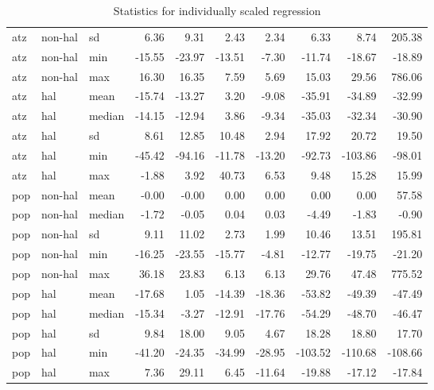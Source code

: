 \begin{table}[ht]
\begin{tabular}{lllrrrrrrr}
  atz & non-hal & sd & 6.36 & 9.31 & 2.43 & 2.34 & 6.33 & 8.74 & 205.38 \\ 
  atz & non-hal & min & -15.55 & -23.97 & -13.51 & -7.30 & -11.74 & -18.67 & -18.89 \\ 
  atz & non-hal & max & 16.30 & 16.35 & 7.59 & 5.69 & 15.03 & 29.56 & 786.06 \\ 
  atz & hal & mean & -15.74 & -13.27 & 3.20 & -9.08 & -35.91 & -34.89 & -32.99 \\ 
  atz & hal & median & -14.15 & -12.94 & 3.86 & -9.34 & -35.03 & -32.34 & -30.90 \\ 
  atz & hal & sd & 8.61 & 12.85 & 10.48 & 2.94 & 17.92 & 20.72 & 19.50 \\ 
  atz & hal & min & -45.42 & -94.16 & -11.78 & -13.20 & -92.73 & -103.86 & -98.01 \\ 
  atz & hal & max & -1.88 & 3.92 & 40.73 & 6.53 & 9.48 & 15.28 & 15.99 \\ 
  pop & non-hal & mean & -0.00 & -0.00 & 0.00 & 0.00 & 0.00 & 0.00 & 57.58 \\ 
  pop & non-hal & median & -1.72 & -0.05 & 0.04 & 0.03 & -4.49 & -1.83 & -0.90 \\ 
  pop & non-hal & sd & 9.11 & 11.02 & 2.73 & 1.99 & 10.46 & 13.51 & 195.81 \\ 
  pop & non-hal & min & -16.25 & -23.55 & -15.77 & -4.81 & -12.77 & -19.75 & -21.20 \\ 
  pop & non-hal & max & 36.18 & 23.83 & 6.13 & 6.13 & 29.76 & 47.48 & 775.52 \\ 
  pop & hal & mean & -17.68 & 1.05 & -14.39 & -18.36 & -53.82 & -49.39 & -47.49 \\ 
  pop & hal & median & -15.34 & -3.27 & -12.91 & -17.76 & -54.29 & -48.70 & -46.47 \\ 
  pop & hal & sd & 9.84 & 18.00 & 9.05 & 4.67 & 18.28 & 18.80 & 17.70 \\ 
  pop & hal & min & -41.20 & -24.35 & -34.99 & -28.95 & -103.52 & -110.68 & -108.66 \\ 
  pop & hal & max & 7.36 & 29.11 & 6.45 & -11.64 & -19.88 & -17.12 & -17.84 \\ 
   \hline
\end{tabular}
\caption{Statistics for individually scaled regression \label{tab:indi_scaled} }
\end{table}


